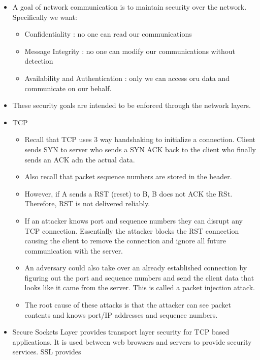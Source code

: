 \documentclass[]{article}
\providecommand{\tightlist}{%
  \setlength{\itemsep}{0pt}\setlength{\parskip}{0pt}}
\begin{document}
\begin{itemize}
\tightlist
\item
  A goal of network communication is to maintain security over the
  network. Specifically we want:

  \begin{itemize}
  \tightlist
  \item
    Confidentiality : no one can read our communications
  \item
    Message Integrity : no one can modify our communications without
    detection
  \item
    Availability and Authentication : only we can access oru data and
    communicate on our behalf.
  \end{itemize}
\item
  These security goals are intended to be enforced through the network
  layers.
\item
  TCP

  \begin{itemize}
  \tightlist
  \item
    Recall that TCP uses 3 way handshaking to initialize a connection.
    Client sends SYN to server who sends a SYN ACK back to the client
    who finally sends an ACK adn the actual data.
  \item
    Also recall that packet sequence numbers are stored in the header.
  \item
    However, if A sends a RST (reset) to B, B does not ACK the RSt.
    Therefore, RST is not delivered reliably.
  \item
    If an attacker knows port and sequence numbers they can disrupt any
    TCP connection. Essentially the attacker blocks the RST connection
    causing the client to remove the connection and ignore all future
    communication with the server.
  \item
    An adversary could also take over an already established connection
    by figuring out the port and sequence numbers and send the client
    data that looks like it came from the server. This is called a
    packet injection attack.
  \item
    The root cause of these attacks is that the attacker can see packet
    contents and knows port/IP addresses and sequence numbers.
  \end{itemize}
\item
  Secure Sockets Layer provides transport layer security for TCP based
  applications. It is used between web browsers and servers to provide
  security services. SSL provides


\end{itemize}
\end{document}
